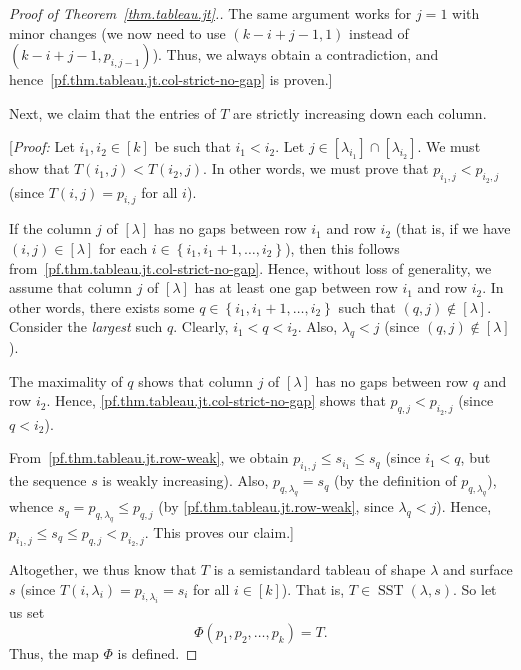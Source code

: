 \documentclass[reqno]{amsart}
\newcommand{\0}{\phantom{c}}
\newcommand{\diag}[1]{\left[#1\right]} %
\DeclareMathOperator{\SST}{SST} %
\newcommand{\set}[1]{\left\{ #1 \right\}}
\newcommand{\tup}[1]{\left( #1 \right)}
\newcommand{\ive}[1]{\left[ #1 \right]}
\theoremstyle{plain}
\theoremstyle{definition}
\numberwithin{equation}{section}
\begin{document}
\begin{proof}[Proof of Theorem~\ref{thm.tableau.jt}.]
The same argument works for $j = 1$ with minor changes (we now need to use $\tup{k-i+j-1, 1}$ instead of $\tup{k-i+j-1, p_{i,j-1}}$).
Thus, we always obtain a contradiction, and hence~\eqref{pf.thm.tableau.jt.col-strict-no-gap} is proven.]

Next, we claim that the entries of $T$ are strictly increasing down each column.

[\textit{Proof:}
Let $i_1,i_2\in\ive{k}$ be such that $i_1 < i_2$.
Let $j \in \ive{\lambda_{i_1}} \cap \ive{\lambda_{i_2}}$.
We must show that $T( i_1,j) < T(i_2, j)$.
In other words, we must prove that $p_{i_1,j} < p_{i_2,j}$ (since $T(i,j) = p_{i,j}$ for all $i$).

If the column $j$ of $\diag{\lambda}$ has no gaps between row $i_1$ and row $i_2$ (that is, if we have $(i,j) \in \diag{\lambda}$ for each $i \in \set{i_1, i_1+1, \dotsc, i_2}$), then this follows from~\eqref{pf.thm.tableau.jt.col-strict-no-gap}.
Hence, without loss of generality, we assume that column $j$ of $\diag{\lambda}$ has at least one gap between row $i_1$ and row $i_2$.
In other words, there exists some $q \in \set{i_1, i_1+1, \dotsc, i_2}$ such that $(q,j) \notin \diag{\lambda}$.
Consider the \emph{largest} such $q$.
Clearly, $i_1 < q < i_2$.
Also, $\lambda_{q} < j$ (since $(q,j) \notin \diag{\lambda}$).

The maximality of $q$ shows that column $j$ of $[\lambda]$ has
no gaps between row $q$ and row $i_2$. Hence,
\eqref{pf.thm.tableau.jt.col-strict-no-gap} shows that $p_{q,j}<p_{i_2,j}$
(since $q<i_2$).

From~\eqref{pf.thm.tableau.jt.row-weak}, we obtain
$p_{i_1,j}\leq s_{i_1}\leq s_{q}$ (since $i_1<q$, but the sequence
$s$ is weakly increasing).
Also, $p_{q,\lambda_{q}}=s_{q}$ (by the definition of $p_{q,\lambda_{q}}$),
whence $s_{q}=p_{q,\lambda_{q}}\leq p_{q,j}$ (by
\eqref{pf.thm.tableau.jt.row-weak}, since $\lambda_{q}<j$). Hence,
$p_{i_1,j}\leq s_{q}\leq p_{q,j}<p_{i_2,j}$. This proves our claim.]

Altogether, we thus know that $T$ is a semistandard tableau of shape $\lambda$
and surface $s$ (since
$T\left(  i,\lambda_i\right)  =p_{i,\lambda_i}=s_i$ for all $i\in\ive{k}$).
That is, $T \in \SST(\lambda, s)$.
So let us set
\[
\Phi\left(  p_1,p_2,\ldots,p_k\right)  =T.
\]
Thus, the map $\Phi$ is defined.


\end{proof}
\end{document}
